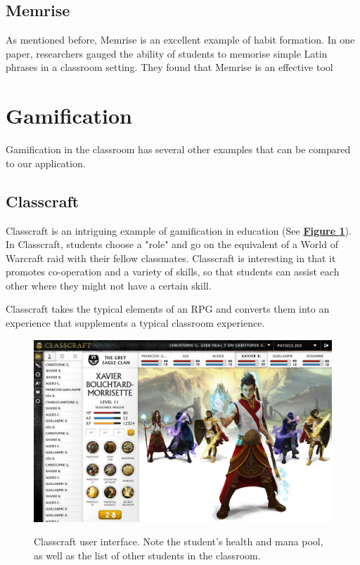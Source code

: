 \subsection{Memrise}
As mentioned before, Memrise is an excellent example of habit formation. In one paper, researchers gauged the ability of students to memorise simple Latin phrases in a classroom setting. They found that Memrise is an effective tool 

\section{Gamification}
Gamification in the classroom has several other examples that can be compared to our application.

\subsection{Classcraft}
Classcraft is an intriguing example of gamification in education (See \textbf{\hyperref[fig:classcraft]{Figure \ref*{fig:classcraft}}}). In Classcraft, students choose a "role" and go on the equivalent of a World of Warcraft raid with their fellow classmates. Classcraft is interesting in that it promotes co-operation and a variety of skills, so that students can assist each other where they might not have a certain skill. 

Classcraft takes the typical elements of an RPG and converts them into an experience that supplements a typical classroom experience.

\begin{figure}[h]
	\includegraphics[width=1.0\linewidth]{figures/classcraft}
	\caption{Classcraft user interface. Note the student's health and mana pool, as well as the list of other students in the classroom.}
	\label{fig:classcraft}
	\cite{hardy_heyes_1999}
\end{figure}

